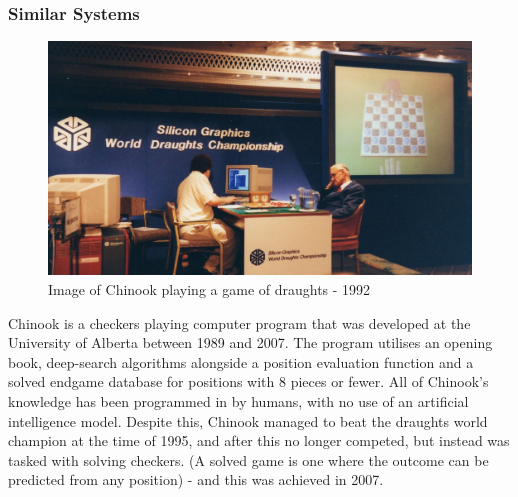\documentclass{article}
\begin{document}
    
    \subsubsection{Similar Systems}
    \begin{figure}
        \centering
        \includegraphics[scale=0.145]{1992Tinsleymatch.jpg}
        \caption{Image of Chinook playing a game of draughts - 1992}
    \end{figure}
    Chinook is a checkers playing computer program that was developed at the University of Alberta between
    1989 and 2007. The program utilises an opening book, deep-search algorithms alongside a position evaluation function
    and a solved endgame database for positions with 8 pieces or fewer.
    All of Chinook's knowledge has been programmed in by humans, with no use of an artificial intelligence model. Despite this,
    Chinook managed to beat the draughts world champion at the time of 1995, and after this no longer competed, but instead was
    tasked with solving checkers. (A solved game is one where the outcome can be predicted from any position) - and this was achieved in 2007.
\end{document}
